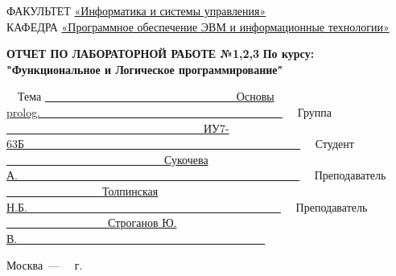 \begin{titlepage}
{	{\doublespacing \small \raggedright ФАКУЛЬТЕТ \hspace{5mm} \underline{«Информатика и системы управления»}\\
	КАФЕДРА \hspace{10mm} \underline{«Программное обеспечение ЭВМ и информационные технологии»}\\}

	\vspace{20mm}

	\begin{center}
		\noindent\begin{minipage}{1.2\textwidth}\centering
			\textbf{ОТЧЕТ ПО ЛАБОРАТОРНОЙ РАБОТЕ №1,2,3}\newline
			\textbf{По курсу: "Функциональное и Логическое программирование"}\newline\newline\newline
		\end{minipage}
	\end{center}

	\vspace{20mm}

	\noindent ~~Тема \underline{~~~~~~~~~~~~~~~~~~~~~~~~~~~~~~~~~~Основы prolog.~~~~~~~~~~~~~~~~~~~~~~~~~~~~~~~~~~~~~~~~~~~}\newline
	\noindent ~~Группа \underline{~~~~~~~~~~~~~~~~~~~~~~~~~~~~~~~~~~~ИУ7-63Б~~~~~~~~~~~~~~~~~~~~~~~~~~~~~~~~~~~~~~~~~~~~~~~~~}\newline
	\noindent ~~Студент \underline{~~~~~~~~~~~~~~~~~~~~~~~~~~~~Сукочева А.~~~~~~~~~~~~~~~~~~~~~~~~~~~~~~~~~~~~~~~~~~~~~~~~~~}\newline
	\noindent ~~Преподаватель \underline{~~~~~~~~~~~~~~~~~Толпинская Н.Б.~~~~~~~~~~~~~~~~~~~~~~~~~~~~~~~~~~~~~~~~~~~~~}\newline
	\noindent ~~Преподаватель \underline{~~~~~~~~~~~~~~~~~~Строганов Ю. В.~~~~~~~~~~~~~~~~~~~~~~~~~~~~~~~~~~~~~~~~~~~~}\newline


	\begin{center}
		\vfill
		Москва~---~\the\year
		~г.
	\end{center}
	}



\end{titlepage}

\setcounter{page}{2}